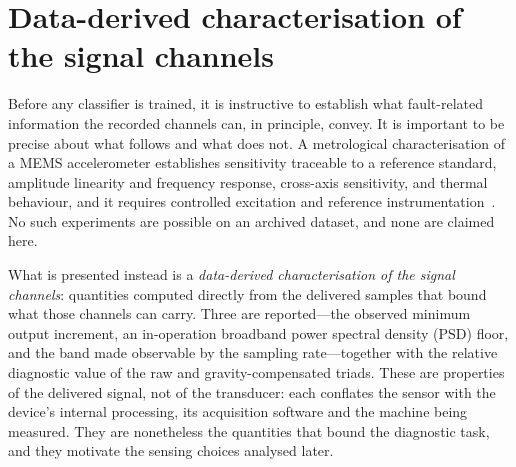 
\section{Data-derived characterisation of the signal channels}
\label{sec:charact}

Before any classifier is trained, it is instructive to establish what
fault-related information the recorded channels can, in principle, convey. It is
important to be precise about what follows and what does not. A metrological
characterisation of a MEMS accelerometer establishes sensitivity traceable to a
reference standard, amplitude linearity and frequency response, cross-axis
sensitivity, and thermal behaviour, and it requires controlled excitation and
reference instrumentation~\cite{prato2021mems, schiavi2023mems, xu2021mems,
wang2025mems, xu2021mems2, khankalantary2021mems}. No such experiments are
possible on an archived dataset, and none are claimed here.

What is presented instead is a \emph{data-derived characterisation of the signal
channels}: quantities computed directly from the delivered samples that bound
what those channels can carry. Three are reported---the observed minimum output
increment, an in-operation broadband power spectral density (PSD) floor, and the
band made observable by the sampling rate---together with the relative diagnostic
value of the raw and gravity-compensated triads. These are properties of the
delivered signal, not of the transducer: each conflates the sensor with the
device's internal processing, its acquisition software and the machine being
measured. They are nonetheless the quantities that bound the diagnostic task, and
they motivate the sensing choices analysed later.

